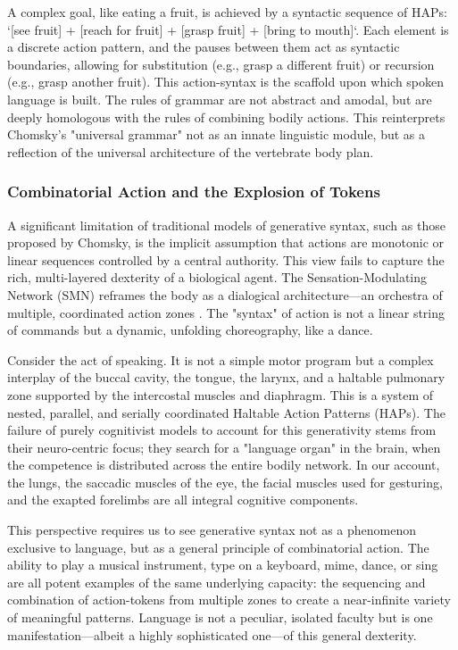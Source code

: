 A complex goal, like eating a fruit, is achieved by a syntactic sequence of HAPs: `[see fruit] + [reach for fruit] + [grasp fruit] + [bring to mouth]`. Each element is a discrete action pattern, and the pauses between them act as syntactic boundaries, allowing for substitution (e.g., grasp a different fruit) or recursion (e.g., grasp another fruit). This action-syntax is the scaffold upon which spoken language is built. The rules of grammar are not abstract and amodal, but are deeply homologous with the rules of combining bodily actions. This reinterprets Chomsky's "universal grammar" not as an innate linguistic module, but as a reflection of the universal architecture of the vertebrate body plan.

\subsubsection{Combinatorial Action and the Explosion of Tokens}
\label{ssubsec:combinatorial}
A significant limitation of traditional models of generative syntax, such as those proposed by Chomsky, is the implicit assumption that actions are monotonic or linear sequences controlled by a central authority. This view fails to capture the rich, multi-layered dexterity of a biological agent. The Sensation-Modulating Network (SMN) reframes the body as a dialogical architecture—an orchestra of multiple, coordinated action zones \cite{bernstein2014dexterity}. The "syntax" of action is not a linear string of commands but a dynamic, unfolding choreography, like a dance.

Consider the act of speaking. It is not a simple motor program but a complex interplay of the buccal cavity, the tongue, the larynx, and a haltable pulmonary zone supported by the intercostal muscles and diaphragm. This is a system of nested, parallel, and serially coordinated Haltable Action Patterns (HAPs). The failure of purely cognitivist models to account for this generativity stems from their neuro-centric focus; they search for a "language organ" in the brain, when the competence is distributed across the entire bodily network. In our account, the lungs, the saccadic muscles of the eye, the facial muscles used for gesturing, and the exapted forelimbs are all integral cognitive components.

This perspective requires us to see generative syntax not as a phenomenon exclusive to language, but as a general principle of combinatorial action. The ability to play a musical instrument, type on a keyboard, mime, dance, or sing are all potent examples of the same underlying capacity: the sequencing and combination of action-tokens from multiple zones to create a near-infinite variety of meaningful patterns. Language is not a peculiar, isolated faculty but is one manifestation—albeit a highly sophisticated one—of this general dexterity.

